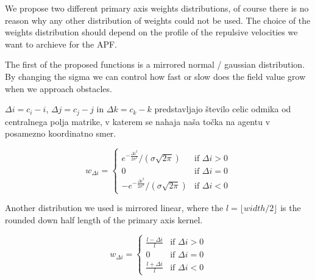 \documentclass[letterpaper, 10 pt, conference]{ieeeconf}  %
\begin{document}


We propose two different primary axis weights distributions, of course there is no reason why any other distribution of weights could not be used. The choice of the weights distribution should depend on the profile of the repulsive velocities we want to archieve for the APF. 

The first of the proposed functions is a mirrored normal / gaussian distribution. By changing the sigma we can control how fast or slow does the field value grow when we approach obstacles.

$\Delta i = c_i - i$, $\Delta j = c_j - j$ in $\Delta k = c_k - k$ predstavljajo število celic odmika od centralnega polja matrike, v katerem se nahaja naša točka na agentu v posamezno koordinatno smer.

\begin{equation}
w_{\Delta i} = 
\begin{cases} 
	e^{-\frac{\Delta i^2}{2\sigma^2}} / (\sigma \sqrt{2\pi}) & \text{if } \Delta i > 0 \\
	0 & \text{if } \Delta i = 0 \\
	-e^{-\frac{\Delta i^2}{2\sigma^2}} / (\sigma \sqrt{2\pi}) & \text{if } \Delta i < 0 
\end{cases}
\end{equation}


Another distribution we used is mirrored linear, where the $l=\lfloor width / 2 \rfloor$ is the rounded down half length of the primary axis kernel. 

\begin{equation}
	w_{\Delta i} = 
	\begin{cases} 
	 	\frac{l - \Delta i}{l} & \text{if } \Delta i > 0 \\
		0 & \text{if } \Delta i = 0 \\
		\frac{l + \Delta i}{l}& \text{if } \Delta i < 0 
	\end{cases}
\end{equation}
\end{document}
